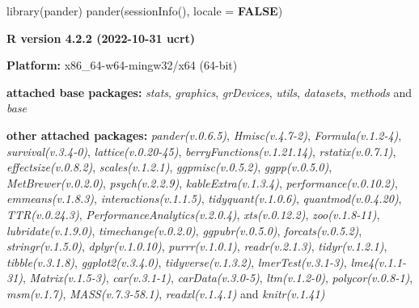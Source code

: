 \documentclass[
  bookmarksnumbered]{article}
\newenvironment{Shaded}{\begin{snugshade}}{\end{snugshade}}
\newcommand{\AttributeTok}[1]{\textcolor[rgb]{0.80,0.80,0.80}{#1}}
\newcommand{\ConstantTok}[1]{\textcolor[rgb]{0.86,0.64,0.64}{\textbf{#1}}}
\newcommand{\FunctionTok}[1]{\textcolor[rgb]{0.94,0.94,0.56}{#1}}
\newcommand{\NormalTok}[1]{\textcolor[rgb]{0.80,0.80,0.80}{#1}}
\begin{document}
\begin{Shaded}
\begin{Highlighting}[]
\FunctionTok{library}\NormalTok{(pander)}
\FunctionTok{pander}\NormalTok{(}\FunctionTok{sessionInfo}\NormalTok{(), }\AttributeTok{locale =} \ConstantTok{FALSE}\NormalTok{)}
\end{Highlighting}
\end{Shaded}

\textbf{R version 4.2.2 (2022-10-31 ucrt)}

\textbf{Platform:} x86\_64-w64-mingw32/x64 (64-bit)

\textbf{attached base packages:}
\emph{stats}, \emph{graphics}, \emph{grDevices}, \emph{utils}, \emph{datasets}, \emph{methods} and \emph{base}

\textbf{other attached packages:}
\emph{pander(v.0.6.5)}, \emph{Hmisc(v.4.7-2)}, \emph{Formula(v.1.2-4)}, \emph{survival(v.3.4-0)}, \emph{lattice(v.0.20-45)}, \emph{berryFunctions(v.1.21.14)}, \emph{rstatix(v.0.7.1)}, \emph{effectsize(v.0.8.2)}, \emph{scales(v.1.2.1)}, \emph{ggpmisc(v.0.5.2)}, \emph{ggpp(v.0.5.0)}, \emph{MetBrewer(v.0.2.0)}, \emph{psych(v.2.2.9)}, \emph{kableExtra(v.1.3.4)}, \emph{performance(v.0.10.2)}, \emph{emmeans(v.1.8.3)}, \emph{interactions(v.1.1.5)}, \emph{tidyquant(v.1.0.6)}, \emph{quantmod(v.0.4.20)}, \emph{TTR(v.0.24.3)}, \emph{PerformanceAnalytics(v.2.0.4)}, \emph{xts(v.0.12.2)}, \emph{zoo(v.1.8-11)}, \emph{lubridate(v.1.9.0)}, \emph{timechange(v.0.2.0)}, \emph{ggpubr(v.0.5.0)}, \emph{forcats(v.0.5.2)}, \emph{stringr(v.1.5.0)}, \emph{dplyr(v.1.0.10)}, \emph{purrr(v.1.0.1)}, \emph{readr(v.2.1.3)}, \emph{tidyr(v.1.2.1)}, \emph{tibble(v.3.1.8)}, \emph{ggplot2(v.3.4.0)}, \emph{tidyverse(v.1.3.2)}, \emph{lmerTest(v.3.1-3)}, \emph{lme4(v.1.1-31)}, \emph{Matrix(v.1.5-3)}, \emph{car(v.3.1-1)}, \emph{carData(v.3.0-5)}, \emph{ltm(v.1.2-0)}, \emph{polycor(v.0.8-1)}, \emph{msm(v.1.7)}, \emph{MASS(v.7.3-58.1)}, \emph{readxl(v.1.4.1)} and \emph{knitr(v.1.41)}
\end{document}
